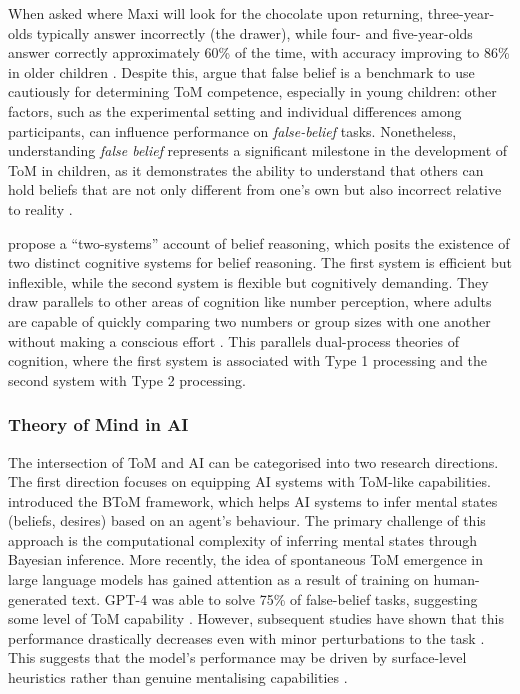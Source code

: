 When asked where Maxi will look for the chocolate upon returning, three-year-olds typically answer incorrectly (the drawer), while four- and five-year-olds answer correctly approximately 60\% of the time, with accuracy improving to 86\% in older children \parencite{Wimmer1983}. Despite this, \textcite{Wellman2001} argue that false belief is a benchmark to use cautiously for determining \ac{ToM} competence, especially in young children: other factors, such as the experimental setting and individual differences among participants, can influence performance on \textit{false-belief} tasks. Nonetheless, understanding \textit{false belief} represents a significant milestone in the development of \ac{ToM} in children, as it demonstrates the ability to understand that others can hold beliefs that are not only different from one's own but also incorrect relative to reality \parencite{Wellman2014}.

\textcite{Apperly2009} propose a \enquote{two-systems} account of belief reasoning, which posits the existence of two distinct cognitive systems for belief reasoning. The first system is efficient but inflexible, while the second system is flexible but cognitively demanding. They draw parallels to other areas of cognition like number perception, where adults are capable of quickly comparing two numbers or group sizes with one another without making a conscious effort \parencite{Apperly2009}. This parallels dual-process theories of cognition, where the first system is associated with Type 1 processing and the second system with Type 2 processing.

\subsubsection{Theory of Mind in \acs{AI}} \label{sssec:theory-of-mind-ai}

The intersection of \ac{ToM} and \ac{AI} can be categorised into two research directions. The first direction focuses on equipping \ac{AI} systems with \ac{ToM}-like capabilities. \textcite{Baker2017} introduced the \ac{BToM} framework, which helps \ac{AI} systems to infer mental states (beliefs, desires) based on an agent's behaviour. The primary challenge of this approach is the computational complexity of inferring mental states through Bayesian inference. More recently, the idea of spontaneous \ac{ToM} emergence in large language models has gained attention as a result of training on human-generated text. GPT-4 was able to solve 75\% of false-belief tasks, suggesting some level of \ac{ToM} capability \parencite{Kosinski2024}. However, subsequent studies have shown that this performance drastically decreases even with minor perturbations to the task \parencite{Chen2024, Ullman2023}. This suggests that the model's performance may be driven by surface-level heuristics rather than genuine mentalising capabilities \parencite[\textit{cf.}][]{Aru2023}.

